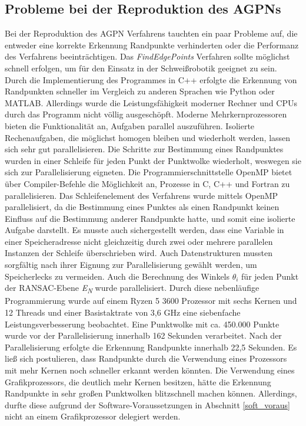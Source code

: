 \subsection{Probleme bei der Reproduktion des AGPNs}
Bei der Reproduktion des AGPN Verfahrens tauchten ein paar Probleme auf, die entweder eine korrekte Erkennung Randpunkte verhinderten oder die Performanz des Verfahrens beeinträchtigen. Das \textit{FindEdgePoints} Verfahren sollte möglichst schnell erfolgen, um für den Einsatz in der Schweißrobotik geeignet zu sein. Durch die Implementierung des Programmes in C++ erfolgte die Erkennung von Randpunkten schneller im Vergleich zu anderen Sprachen wie Python oder MATLAB. Allerdings wurde die Leistungsfähigkeit moderner Rechner und CPUs durch das Programm nicht völlig ausgeschöpft. Moderne Mehrkernprozessoren bieten die Funktionalität an, Aufgaben parallel auszuführen. Isolierte Rechenaufgaben, die möglichst homogen bleiben und wiederholt werden, lassen sich sehr gut parallelisieren. Die Schritte zur Bestimmung eines Randpunktes wurden in einer Schleife für jeden Punkt der Punktwolke wiederholt, weswegen sie sich zur Parallelisierung eigneten. Die Programmierschnittstelle OpenMP bietet über Compiler-Befehle die Möglichkeit an, Prozesse in C, C++ und Fortran zu parallelisieren. Das Schleifenelement des Verfahrens wurde mittels OpenMP parallelisiert, da die Bestimmung eines Punktes als einen Randpunkt keinen Einfluss auf die Bestimmung anderer Randpunkte hatte, und somit eine isolierte Aufgabe darstellt. Es musste auch sichergestellt werden, dass eine Variable in einer Speicheradresse nicht gleichzeitig durch zwei oder mehrere parallelen Instanzen der Schleife überschrieben wird. Auch Datenstrukturen mussten sorgfältig nach ihrer Eignung zur Parallelisierung gewählt werden, um Speicherlecks zu vermeiden. Auch die Berechnung des Winkels $\theta_i$ für jeden Punkt der RANSAC-Ebene \textit{E\textsubscript{N}} wurde parallelisiert. Durch diese nebenläufige Programmierung wurde auf einem Ryzen 5 3600 Prozessor \autocite{noauthor_amd_2022} mit sechs Kernen und 12 Threads und einer Basistaktrate von 3,6 GHz eine siebenfache Leistungsverbesserung beobachtet. Eine Punktwolke mit ca. 450.000 Punkte wurde vor der Parallelisierung innerhalb 162 Sekunden verarbeitet. Nach der Parallelisierung erfolgte die Erkennung Randpunkte innerhalb 22,5 Sekunden. Es ließ sich postulieren, dass Randpunkte durch die Verwendung eines Prozessors mit mehr Kernen noch schneller erkannt werden könnten. Die Verwendung eines Grafikprozessors, die deutlich mehr Kernen besitzen, hätte die Erkennung Randpunkte in sehr großen Punktwolken blitzschnell machen können. Allerdings, durfte diese aufgrund der Software-Voraussetzungen in Abschnitt \ref{soft_voraus} nicht an einem Grafikprozessor delegiert werden.

